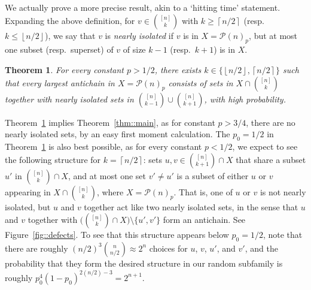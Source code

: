\documentclass[12pt]{article}
\renewcommand{\P}{\mathcal{P}}
\newcommand{\floor}[1]{\left\lfloor#1\right\rfloor}
\newcommand{\ceil}[1]{\left\lceil#1\right\rceil}
\newtheorem{theorem}{Theorem}
\begin{document}
We actually prove a more precise result, akin to a `hitting time' statement. Expanding the above definition, for $v \in \binom{[n]}{k}$ with $k \geq \ceil{n/2}$ (resp.\ $k \leq \floor{n/2}$), we say that $v$ is \emph{nearly isolated} if $v$ is in $X=\P(n)_p$, but at most one subset (resp.\ superset) of $v$ of size $k-1$ (resp.\ $k+1$) is in $X$.
\begin{theorem}\label{thm::hit}
For every constant $p>1/2$, there exists $k \in \{\floor{n/2},\ceil{n/2}\}$ such that every largest antichain in $X = \P(n)_p$ consists of sets in $X \cap \binom{[n]}{k}$ together with nearly isolated sets in $\binom{[n]}{k-1} \cup \binom{[n]}{k+1}$, with high probability.
\end{theorem}
Theorem~\ref{thm::hit} implies Theorem~\ref{thm::main}, as for constant $p>3/4$, there are no nearly isolated sets, by an easy first moment calculation. The $p_0 = 1/2$ in Theorem~\ref{thm::hit} is also best possible, as for every constant $p<1/2$, we expect to see the following structure for $k = \ceil{n/2}$: sets $u,v \in \binom{[n]}{k+1} \cap X$ that share a subset $u'$ in $\binom{[n]}{k} \cap X$, and at most one set $v' \neq u'$ is a subset of either $u$ or $v$ appearing in $X \cap \binom{[n]}{k}$, where $X = \P(n)_p$. That is, one of $u$ or $v$ is not nearly isolated, but $u$ and $v$ together act like two nearly isolated sets, in the sense that $u$ and $v$ together with $\big(\binom{[n]}{k} \cap X\big) \setminus \{u',v'\}$ form an antichain. See Figure~\ref{fig::defects}. To see that this structure appears below $p_0 = 1/2$, note that there are roughly $(n/2)^3 \binom{n}{n/2} \approx 2^n$ choices for $u$, $v$, $u'$, and $v'$, and the probability that they form the desired structure in our random subfamily is roughly $p_0^4 (1-p_0)^{2(n/2)-3} = 2^{n+1}$.

\end{document}
